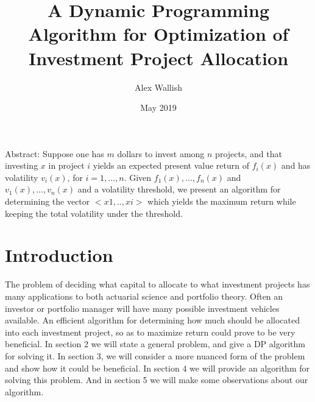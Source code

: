 \documentclass{article}
\title{A Dynamic Programming Algorithm for Optimization of Investment Project Allocation}
\author{Alex Wallish}
\date{May 2019}
\begin{document}
\maketitle

Abstract: 
Suppose one has $m$ dollars to invest among $n$ projects, and that investing $x$ in project $i$ yields an expected present value return of $f_{i}(x)$ and has volatility $v_{i}(x)$, for $ i = 1, ..., n. $ Given $f_{1}(x),...,f_{n}(x)$ and $v_{1}(x),...,v_{n}(x)$ and a volatility threshold, we present an algorithm for determining the vector $<x1,..,xi>$ which yields the maximum return while keeping the total volatility under the threshold.  



\pagebreak
\section{Introduction}
The problem of deciding what capital to allocate to what investment projects has many applications to both actuarial science and portfolio theory.  Often an investor or portfolio manager will have many possible investment vehicles available. An efficient algorithm for determining how much should be allocated into each investment project, so as to maximize return could prove to be very beneficial. In section 2 we will state a general problem, and give a DP algorithm for solving it.  In section 3, we will consider a more nuanced form of the problem and show how it could be beneficial.  In section 4 we will provide an algorithm for solving this problem.  And in section 5 we will make some observations about our algorithm. 
\end{document}
